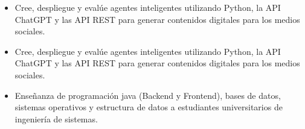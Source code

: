 \documentclass[10pt,letter,ragged2e,withhyper]{altacv}
\begin{document}
\begin{paracol}{2}


\begin{itemize}
\item Cree, despliegue y evalúe agentes inteligentes utilizando Python, la API ChatGPT y las API REST para generar contenidos digitales para los medios sociales. 
\end{itemize}

\divider

\begin{itemize}
\item Cree, despliegue y evalúe agentes inteligentes utilizando Python, la API ChatGPT y las API REST para generar contenidos digitales para los medios sociales.
\end{itemize}

\divider

\begin{itemize}
\item Enseñanza de programación java (Backend y Frontend), bases de datos, sistemas operativos y estructura de datos a estudiantes universitarios de ingeniería de sistemas.
\end{itemize}

\divider





\end{paracol}
\end{document}
